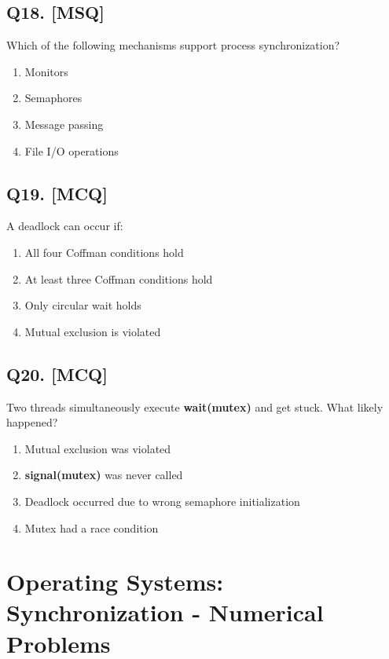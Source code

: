 \subsection*{Q18. [MSQ]}
Which of the following mechanisms support process synchronization?
 
\begin{enumerate}[label=(\alph*)]
    \item Monitors
    \item Semaphores
    \item Message passing
    \item File I/O operations
\end{enumerate}

\subsection*{Q19. [MCQ]}
A deadlock can occur if:

\begin{enumerate}[label=(\alph*)]
    \item All four Coffman conditions hold
    \item At least three Coffman conditions hold
    \item Only circular wait holds
    \item Mutual exclusion is violated
\end{enumerate}

\subsection*{Q20. [MCQ]}
Two threads simultaneously execute \textbf{wait(mutex)} and get stuck. What likely happened?

\begin{enumerate}[label=(\alph*)]
    \item Mutual exclusion was violated
    \item \textbf{signal(mutex)} was never called
    \item Deadlock occurred due to wrong semaphore initialization
    \item Mutex had a race condition
\end{enumerate}

\section[Operating Systems: Synchronization - Numerical Problems]
{Operating Systems:\\ Synchronization - Numerical Problems}

